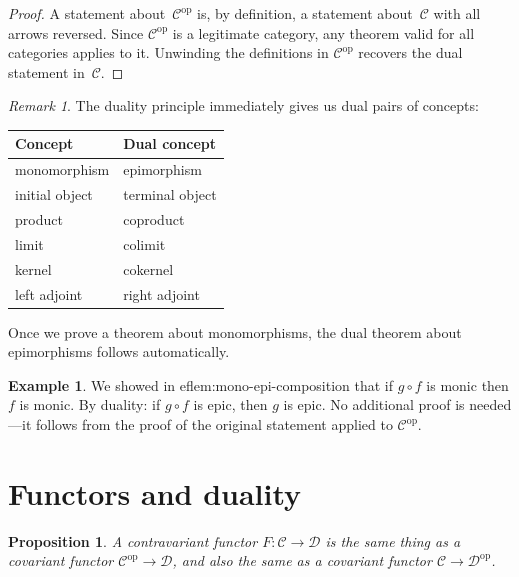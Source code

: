 \documentclass[a4paper,12pt]{book}
\newcommand{\op}{\mathrm{op}}
\theoremstyle{definition}
\newtheorem{example}[definition]{Example}
\theoremstyle{plain}
\newtheorem{proposition}[definition]{Proposition}
\theoremstyle{remark}
\newtheorem{remark}[definition]{Remark}
\begin{document}
\begin{proof}
A statement about~$\mathcal{C}^{\op}$ is, by definition, a statement
about~$\mathcal{C}$ with all arrows reversed.
Since $\mathcal{C}^{\op}$ is a legitimate category, any theorem valid
for all categories applies to it.
Unwinding the definitions in $\mathcal{C}^{\op}$ recovers the dual
statement in~$\mathcal{C}$.
\end{proof}

\begin{remark}\label{rem:duality-examples}
The duality principle immediately gives us dual pairs of concepts:
\begin{center}
\begin{tabular}{ll}
\toprule
\textbf{Concept} & \textbf{Dual concept} \\
\midrule
monomorphism & epimorphism \\
initial object & terminal object \\
product & coproduct \\
limit & colimit \\
kernel & cokernel \\
left adjoint & right adjoint \\
\bottomrule
\end{tabular}
\end{center}
Once we prove a theorem about monomorphisms, the dual theorem about
epimorphisms follows automatically.
\end{remark}

\begin{example}\label{ex:duality-mono-epi}
We showed in 
ef{lem:mono-epi-composition} that if $g\circ f$ is monic
then $f$ is monic.  By duality: if $g\circ f$ is epic, then $g$ is
epic.  No additional proof is needed---it follows from the proof of the
original statement applied to $\mathcal{C}^{\op}$.
\end{example}


\section{Functors and duality}\label{sec:functors-duality}

\begin{proposition}\label{prop:contravariant-op}
A contravariant functor $F\colon\mathcal{C}\to\mathcal{D}$ is the same
thing as a covariant functor $\mathcal{C}^{\op}\to\mathcal{D}$, and
also the same as a covariant functor $\mathcal{C}\to\mathcal{D}^{\op}$.
\end{proposition}
\end{document}
